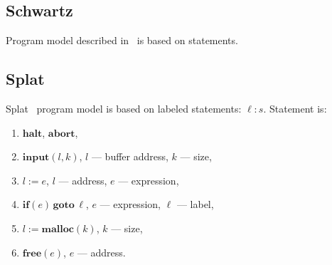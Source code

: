 \documentclass[oneside,a4paper]{article}  %
\newcommand{\sublevel}{\subsection}
\begin{document}
\sublevel{Schwartz}

Program model described in~\cite{dta_fse} is based on statements.

\sublevel{Splat}

Splat~\cite{splat} program model is based on labeled statements: $\ell: s$.
Statement is:
\begin{enumerate}[itemsep=-0.5ex]
    \item $\textbf{halt}$, $\textbf{abort}$,
    \item $\textbf{input}(l, k)$, $l$ --- buffer address, $k$ --- size,
    \item $l := e$, $l$ --- address, $e$ --- expression,
    \item $\textbf{if}(e)\,\textbf{goto}\, \ell$, $e$ --- expression,
        $\ell$ --- label,
    \item $l := \textbf{malloc}(k)$, $k$ --- size,
    \item $\textbf{free}(e)$, $e$ --- address.
\end{enumerate}

\setlength{\parskip}{0em}
\pagebreak
\tableofcontents
\pagebreak
\setlength{\parskip}{0.5em}

\printindex

{}

\end{document}
